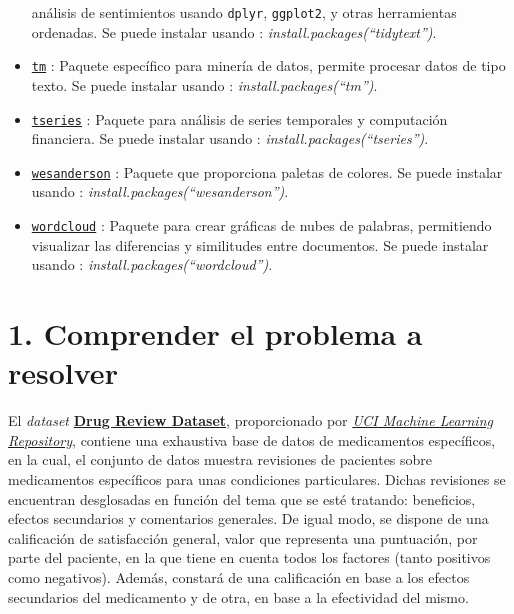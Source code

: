 \documentclass[spanish,]{article}
\begin{document}
\begin{itemize}
  análisis de sentimientos usando \texttt{dplyr}, \texttt{ggplot2}, y
  otras herramientas ordenadas. Se puede instalar usando :
  \emph{install.packages(``tidytext'')}.
\item
  \href{https://cran.r-project.org/web/packages/tm/tm.pdf}{\texttt{tm}}
  : Paquete específico para minería de datos, permite procesar datos de
  tipo texto. Se puede instalar usando :
  \emph{install.packages(``tm'')}.
\item
  \href{https://cran.r-project.org/web/packages/tseries/tseries.pdf}{\texttt{tseries}}
  : Paquete para análisis de series temporales y computación financiera.
  Se puede instalar usando : \emph{install.packages(``tseries'')}.
\item
  \href{https://cran.r-project.org/web/packages/wesanderson/wesanderson.pdf}{\texttt{wesanderson}}
  : Paquete que proporciona paletas de colores. Se puede instalar usando
  : \emph{install.packages(``wesanderson'')}.
\item
  \href{https://cran.r-project.org/web/packages/wordcloud/wordcloud.pdf}{\texttt{wordcloud}}
  : Paquete para crear gráficas de nubes de palabras, permitiendo
  visualizar las diferencias y similitudes entre documentos. Se puede
  instalar usando : \emph{install.packages(``wordcloud'')}.
\end{itemize}

\newpage

\section{1. Comprender el problema a
resolver}\label{comprender-el-problema-a-resolver}

El \emph{dataset}
\href{https://archive.ics.uci.edu/ml/datasets/Drug+Review+Dataset+\%28Druglib.com\%29}{\textbf{Drug
Review Dataset}}, proporcionado por
\href{https://archive.ics.uci.edu/ml/index.php}{\emph{UCI Machine
Learning Repository}}, contiene una exhaustiva base de datos de
medicamentos específicos, en la cual, el conjunto de datos muestra
revisiones de pacientes sobre medicamentos específicos para unas
condiciones particulares. Dichas revisiones se encuentran desglosadas en
función del tema que se esté tratando: beneficios, efectos secundarios y
comentarios generales. De igual modo, se dispone de una calificación de
satisfacción general, valor que representa una puntuación, por parte del
paciente, en la que tiene en cuenta todos los factores (tanto positivos
como negativos). Además, constará de una calificación en base a los
efectos secundarios del medicamento y de otra, en base a la efectividad
del mismo.
\end{document}
